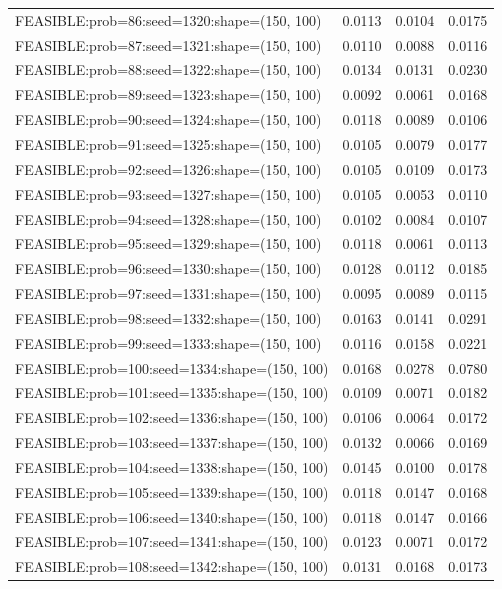 \begin{longtable}{lccc}
FEASIBLE:prob=86:seed=1320:shape=(150, 100)  &   0.0113 & 0.0104 & 0.0175 \\
FEASIBLE:prob=87:seed=1321:shape=(150, 100)  &   0.0110 & 0.0088 & 0.0116 \\
FEASIBLE:prob=88:seed=1322:shape=(150, 100)  &   0.0134 & 0.0131 & 0.0230 \\
FEASIBLE:prob=89:seed=1323:shape=(150, 100)  &   0.0092 & 0.0061 & 0.0168 \\
FEASIBLE:prob=90:seed=1324:shape=(150, 100)  &   0.0118 & 0.0089 & 0.0106 \\
FEASIBLE:prob=91:seed=1325:shape=(150, 100)  &   0.0105 & 0.0079 & 0.0177 \\
FEASIBLE:prob=92:seed=1326:shape=(150, 100)  &   0.0105 & 0.0109 & 0.0173 \\
FEASIBLE:prob=93:seed=1327:shape=(150, 100)  &   0.0105 & 0.0053 & 0.0110 \\
FEASIBLE:prob=94:seed=1328:shape=(150, 100)  &   0.0102 & 0.0084 & 0.0107 \\
FEASIBLE:prob=95:seed=1329:shape=(150, 100)  &   0.0118 & 0.0061 & 0.0113 \\
FEASIBLE:prob=96:seed=1330:shape=(150, 100)  &   0.0128 & 0.0112 & 0.0185 \\
FEASIBLE:prob=97:seed=1331:shape=(150, 100)  &   0.0095 & 0.0089 & 0.0115 \\
FEASIBLE:prob=98:seed=1332:shape=(150, 100)  &   0.0163 & 0.0141 & 0.0291 \\
FEASIBLE:prob=99:seed=1333:shape=(150, 100)  &   0.0116 & 0.0158 & 0.0221 \\
FEASIBLE:prob=100:seed=1334:shape=(150, 100) &   0.0168 & 0.0278 & 0.0780 \\
FEASIBLE:prob=101:seed=1335:shape=(150, 100) &   0.0109 & 0.0071 & 0.0182 \\
FEASIBLE:prob=102:seed=1336:shape=(150, 100) &   0.0106 & 0.0064 & 0.0172 \\
FEASIBLE:prob=103:seed=1337:shape=(150, 100) &   0.0132 & 0.0066 & 0.0169 \\
FEASIBLE:prob=104:seed=1338:shape=(150, 100) &   0.0145 & 0.0100 & 0.0178 \\
FEASIBLE:prob=105:seed=1339:shape=(150, 100) &   0.0118 & 0.0147 & 0.0168 \\
FEASIBLE:prob=106:seed=1340:shape=(150, 100) &   0.0118 & 0.0147 & 0.0166 \\
FEASIBLE:prob=107:seed=1341:shape=(150, 100) &   0.0123 & 0.0071 & 0.0172 \\
FEASIBLE:prob=108:seed=1342:shape=(150, 100) &   0.0131 & 0.0168 & 0.0173 \\

\end{longtable}
